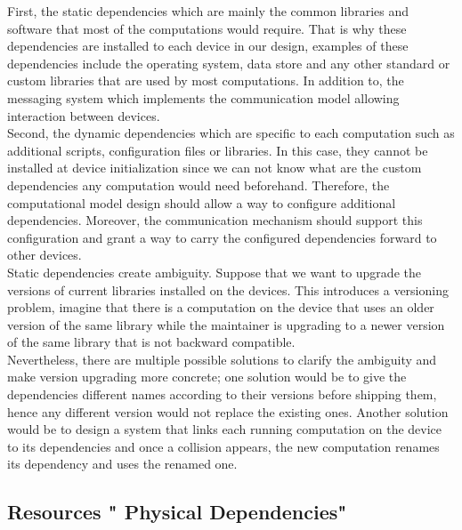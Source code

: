 \noindent First, the static dependencies which are mainly the common libraries and software that most of the computations would require. That is why these dependencies are installed to each device in our design, examples of these dependencies include the operating system, data store and any other standard or custom libraries that are used by most computations. In addition to, the messaging system which implements the communication model allowing interaction between devices. \\

\noindent Second, the dynamic dependencies which are specific to each computation such as additional scripts, configuration files or libraries. In this case, they cannot be installed at device initialization since we can not know what are the custom dependencies any computation would need beforehand. Therefore, the computational model design should allow a way to configure additional dependencies. Moreover, the communication mechanism should support this configuration and grant a way to carry the configured dependencies forward to other devices.\\
 
 
\noindent Static dependencies create ambiguity. Suppose that we want to upgrade the versions of current libraries installed on the devices. This introduces a  versioning problem, imagine that there is a computation on the device that uses an older version of the same library while the maintainer is upgrading to a newer version of the same library that is not backward compatible.  \\
  
\noindent Nevertheless, there are multiple possible solutions to clarify the ambiguity and make  version upgrading more concrete; one solution would be to give the dependencies different names according to their versions before shipping them, hence any different version would not replace the existing ones. Another solution would be to design a system that links each running computation on the device to its dependencies and once a collision appears, the new computation renames its dependency and uses the renamed one.
 

\subsection {Resources " Physical Dependencies" }


